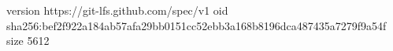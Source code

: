 version https://git-lfs.github.com/spec/v1
oid sha256:bef2f922a184ab57afa29bb0151cc52ebb3a168b8196dca487435a7279f9a54f
size 5612
